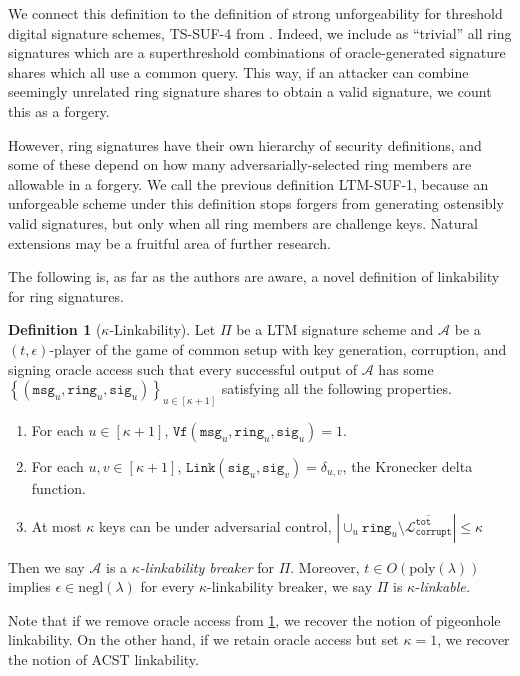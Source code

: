 \documentclass[11pt]{article}
\theoremstyle{definition}
\newtheorem{definition}[definition]{Definition}
\newcommand{\ring}{\texttt{ring}}
\newcommand{\sig}{\texttt{sig}}
\newcommand{\secpar}{\lambda}
\newcommand{\msg}{\texttt{msg}}
\newcommand{\verify}{\texttt{Vf}}
\newcommand{\link}{\texttt{Link}}
\newcommand{\polysecpar}{O(\text{poly}(\secpar))}
\newcommand{\negl}{\text{negl}(\secpar)}
\newcommand{\corruptedTotalKeys}{\mathcal{L}_{\texttt{corrupt}}^{\texttt{tot}}}
\begin{document}
We connect this definition to the definition of strong unforgeability for threshold digital signature schemes, TS-SUF-4 from \cite{bellare2022better}. Indeed, we include as ``trivial'' all ring signatures which are a superthreshold combinations of oracle-generated signature shares which all use a common query. This way, if an attacker can combine seemingly unrelated ring signature shares to obtain a valid signature, we count this as a forgery. 

However, ring signatures have their own hierarchy of security definitions, and some of these depend on how many adversarially-selected ring members are allowable in a forgery. We call the previous definition LTM-SUF-1, because an unforgeable scheme under this definition stops forgers from generating ostensibly valid signatures, but only when all ring members are challenge keys. Natural extensions may be a fruitful area of further research.


The following is, as far as the authors are aware, a novel definition of linkability for ring signatures.

\begin{definition}[$\kappa$-Linkability]\label{def:linkable}
Let $\Pi$ be a LTM signature scheme and $\mathcal{A}$ be a $(t,\epsilon)$-player of the game of common setup with key generation, corruption, and signing oracle access such that every successful output of $\mathcal{A}$ has some $\left\{(\msg_u, \ring_u, \sig_u)\right\}_{u\in[\kappa+1]}$ satisfying all the following properties.
\begin{enumerate}
\item For each $u \in [\kappa+1]$, $\verify(\msg_u, \ring_u, \sig_u) = 1$.


\item For each $u, v \in [\kappa+1]$, $\link(\sig_u, \sig_v) = \delta_{u,v}$, the Kronecker delta function.
\item At most $\kappa$ keys can be under adversarial control, $\left|\cup_u \ring_u \setminus \overline{\corruptedTotalKeys}\right| \leq \kappa$
\end{enumerate}
Then we say $\mathcal{A}$ is a \textit{$\kappa$-linkability breaker} for $\Pi$. Moreover, $t \in \polysecpar$ implies $\epsilon \in \negl$ for every $\kappa$-linkability breaker, we say $\Pi$ is $\kappa$-\textit{linkable.}
\end{definition}

Note that if we remove oracle access from \cref{def:linkable}, we recover the notion of pigeonhole linkability. On the other hand, if we retain oracle access but set $\kappa = 1$, we recover the notion of ACST linkability.
\end{document}
